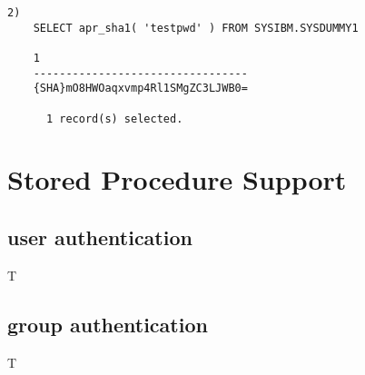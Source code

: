 \documentclass[11pt,a4paper]{article}
\begin{document}
\begin{appendix}
\begin{verbatim}
2)
    SELECT apr_sha1( 'testpwd' ) FROM SYSIBM.SYSDUMMY1

    1
    ---------------------------------
    {SHA}mO8HWOaqxvmp4Rl1SMgZC3LJWB0=

      1 record(s) selected.
\end{verbatim}
\newpage
\hypertarget{hsps}{}
\section{Stored Procedure Support} \label{sp}
\hypertarget{husersp}{}
\subsection{user authentication} \label{usersp}
T
\newpage
\hypertarget{hgroupsp}{}
\subsection{group authentication} \label{groupsp}
T

\end{appendix}
\end{document}
